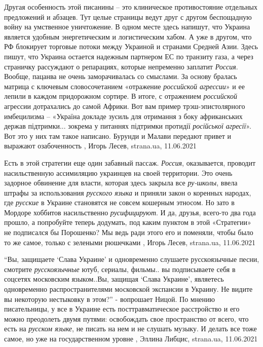 Другая особенность этой писанины – это клиническое противостояние отдельных
предложений и абзацев. Тут целые страницы ведут друг с другом беспощадную войну
на умственное уничтожение. В одном месте здесь напишут, что Украина является
удобным энергетическим и логистическим хабом. А уже в другом, что РФ блокирует
торговые потоки между Украиной и странами Средней Азии. Здесь пишут, что
Украина остается надежным партнером ЕС по транзиту газа, а через страничку
рассуждают о репарациях, которые непременно заплатит \emph{Россия}.  Вообще, пацанва
не очень заморачивалась со смыслами. За основу бралась матрица с ключевым
словосочетанием «отражение \emph{российской агрессии}» и ее лепили в каждом
придорожном сортире. В итоге, с отражением \emph{российской} агрессии дотрахались до
самой Африки. Вот вам пример трэш-эпистолярного имбецилизма – «Україна докладе
зусиль для отримання з боку африканських держав підтримки... зокрема у питаннях
підтримки протидії \emph{російської агресії}». Вот это у них там такое написано.
Бурунди и Малави передают привет и выражают озабоченность
, Игорь Лесев, strana.ua, 11.06.2021 

Есть в этой стратегии еще один забавный пассаж. \emph{Россия}, оказывается, проводит
насильственную ассимиляцию украинцев на своей территории. Это очень задорное
обвинение для власти, которая здесь закрыла все \emph{ру-школы}, ввела штрафы за
использования \emph{русского языка} и приняли закон о коренных народах, где \emph{русские} в
Украине становятся не совсем кошерным этносом. Но зато в Мордоре хоббитов
насильственно \emph{русифицируют}.  И да, друзья, всего-то два года прошло, а
попробуйте теперь додумать, под каким пунктом в этой «Стратегии» не подписался
бы Порошенко? Мы ведь ради этого его и поменяли, чтобы было то же самое, только
с зелеными рюшечками
, Игорь Лесев, strana.ua, 11.06.2021 

\enquote{Вы, защищаете \enquote{Слава Украине} и одновременно слушаете
русскоязычные песни, смотрите \emph{русскоязычные} ютуб, сериалы, фильмы.. вы
подписываете себя в соцсетях московским языком..Вы, защищая \enquote{Слава
Украине}, являетесь одновременно распространителями московской экспансии в
Украину. Не видите вы некоторую нестыковку в этом?} - вопрошает Ницой.  По
мнению писательницы, у все в Украине есть посттравматическое расстройство и его
можно преодолеть двумя путями: освобождать свое пространство от всего, что есть
на \emph{русском языке}, не писать на нем и не слушать музыку. И делать все тоже
самое, но уже на государственном уровне
, Эллина Либцис, strana.ua, 11.06.2021

